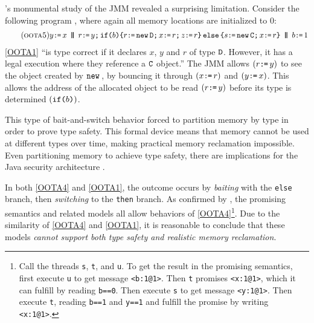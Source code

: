 \citeauthor{DBLP:journals/toplas/Lochbihler13}'s
monumental study of the JMM
revealed a surprising limitation. Consider the following program
\citep[Fig.~8]{DBLP:journals/toplas/Lochbihler13}, where again
all memory locations are initialized to $0$:
\begin{gather}
  \tag{\textsc{oota5}}\label{OOTA1}
  y\GETS x
  \PAR
  \aReg\GETS y \SEMI \IF{b} \THEN \aReg \GETS \NEW \classD \SEMI x \GETS \aReg \SEMI z\GETS \aReg \ELSE \bReg \GETS \NEW \classC \SEMI x \GETS \aReg \FI  
  \PAR %
  b \GETS 1
\end{gather}
\ref{OOTA1} ``is type correct if it declares $x$, $y$ and $r$ of type
$\mathtt{D}$. However, it has a legal execution where they reference a $\mathtt{C}$
object.''  The JMM allows $(r\texttt{:}\mkern-1mu\texttt{=}\, y)$ to see the object created by
$\texttt{new}\,$, by bouncing it through $(x \texttt{:}\mkern-1mu\texttt{=}\, r)$ and $(y\texttt{:}\mkern-1mu\texttt{=}\, x)$.  This
allows the address of the allocated object to be read $(r\texttt{:}\mkern-1mu\texttt{=}\, y)$ before
its type is determined $(\texttt{if}\allowbreak\texttt{(}b\texttt{)})$.



This type of {bait-and-switch} behavior forced
\citeauthor{DBLP:journals/toplas/Lochbihler13} to partition memory by type in
order to prove type safety.  This formal device means that memory cannot be
used at different types over time, making practical memory reclamation
impossible.  Even partitioning memory to achieve type safety, there are
implications for the Java security architecture
\cite[]{DBLP:journals/toplas/Lochbihler13}.

In both \ref{OOTA4} and \ref{OOTA1}, the \oota{} outcome occurs by
\emph{baiting} with the \texttt{else} branch, then \emph{switching} to the
\texttt{then} branch.  As confirmed by \cite{kang,soham}, the promising
semantics \cite{DBLP:conf/popl/KangHLVD17} and related models
\citep{DBLP:conf/esop/JagadeesanPR10,DBLP:journals/pacmpl/ChakrabortyV19} all
allow \oota{} behaviors of \ref{OOTA4}\footnote{Call the threads \texttt{s},
  \texttt{t}, and \texttt{u}.  To get the result in the promising semantics,
  first execute \texttt{u} to get message \texttt{<b:1@1>}.  Then \texttt{t}
  promises \texttt{<x:1@1>}, which it can fulfill by reading \texttt{b==0}.
  Then execute \texttt{s} to get message \texttt{<y:1@1>}.  Then execute
  \texttt{t}, reading \texttt{b==1} and \texttt{y==1} and fulfill the promise
  by writing \texttt{<x:1@1>}.}.  Due to the similarity of \ref{OOTA4} and
\ref{OOTA1}, it is reasonable to conclude that these models \emph{cannot
  support both type safety and realistic memory reclamation}.

